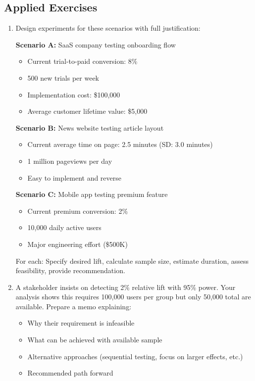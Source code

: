 \subsection{Applied Exercises}

\begin{enumerate}
    \item Design experiments for these scenarios with full justification:

    \textbf{Scenario A:} SaaS company testing onboarding flow
    \begin{itemize}
        \item Current trial-to-paid conversion: 8\%
        \item 500 new trials per week
        \item Implementation cost: \$100,000
        \item Average customer lifetime value: \$5,000
    \end{itemize}

    \textbf{Scenario B:} News website testing article layout
    \begin{itemize}
        \item Current average time on page: 2.5 minutes (SD: 3.0 minutes)
        \item 1 million pageviews per day
        \item Easy to implement and reverse
    \end{itemize}

    \textbf{Scenario C:} Mobile app testing premium feature
    \begin{itemize}
        \item Current premium conversion: 2\%
        \item 10,000 daily active users
        \item Major engineering effort (\$500K)
    \end{itemize}

    For each: Specify desired lift, calculate sample size, estimate duration, assess feasibility, provide recommendation.

    \item A stakeholder insists on detecting 2\% relative lift with 95\% power. Your analysis shows this requires 100,000 users per group but only 50,000 total are available. Prepare a memo explaining:
    \begin{itemize}
        \item Why their requirement is infeasible
        \item What can be achieved with available sample
        \item Alternative approaches (sequential testing, focus on larger effects, etc.)
        \item Recommended path forward
    \end{itemize}


\end{enumerate}
